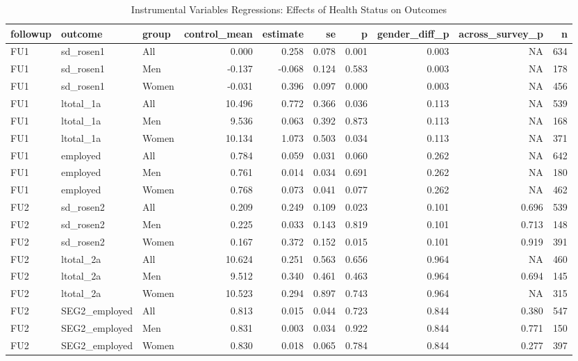 \begin{table}

\caption{Instrumental Variables Regressions: Effects of Health Status on Outcomes}
\centering
\begin{tabular}[t]{lllrrrrrrr}
\toprule
followup & outcome & group & control\_mean & estimate & se & p & gender\_diff\_p & across\_survey\_p & n\\
\midrule
FU1 & sd\_rosen1 & All & 0.000 & 0.258 & 0.078 & 0.001 & 0.003 & NA & 634\\
FU1 & sd\_rosen1 & Men & -0.137 & -0.068 & 0.124 & 0.583 & 0.003 & NA & 178\\
FU1 & sd\_rosen1 & Women & -0.031 & 0.396 & 0.097 & 0.000 & 0.003 & NA & 456\\
FU1 & ltotal\_1a & All & 10.496 & 0.772 & 0.366 & 0.036 & 0.113 & NA & 539\\
FU1 & ltotal\_1a & Men & 9.536 & 0.063 & 0.392 & 0.873 & 0.113 & NA & 168\\
\addlinespace
FU1 & ltotal\_1a & Women & 10.134 & 1.073 & 0.503 & 0.034 & 0.113 & NA & 371\\
FU1 & employed & All & 0.784 & 0.059 & 0.031 & 0.060 & 0.262 & NA & 642\\
FU1 & employed & Men & 0.761 & 0.014 & 0.034 & 0.691 & 0.262 & NA & 180\\
FU1 & employed & Women & 0.768 & 0.073 & 0.041 & 0.077 & 0.262 & NA & 462\\
FU2 & sd\_rosen2 & All & 0.209 & 0.249 & 0.109 & 0.023 & 0.101 & 0.696 & 539\\
\addlinespace
FU2 & sd\_rosen2 & Men & 0.225 & 0.033 & 0.143 & 0.819 & 0.101 & 0.713 & 148\\
FU2 & sd\_rosen2 & Women & 0.167 & 0.372 & 0.152 & 0.015 & 0.101 & 0.919 & 391\\
FU2 & ltotal\_2a & All & 10.624 & 0.251 & 0.563 & 0.656 & 0.964 & NA & 460\\
FU2 & ltotal\_2a & Men & 9.512 & 0.340 & 0.461 & 0.463 & 0.964 & 0.694 & 145\\
FU2 & ltotal\_2a & Women & 10.523 & 0.294 & 0.897 & 0.743 & 0.964 & NA & 315\\
\addlinespace
FU2 & SEG2\_employed & All & 0.813 & 0.015 & 0.044 & 0.723 & 0.844 & 0.380 & 547\\
FU2 & SEG2\_employed & Men & 0.831 & 0.003 & 0.034 & 0.922 & 0.844 & 0.771 & 150\\
FU2 & SEG2\_employed & Women & 0.830 & 0.018 & 0.065 & 0.784 & 0.844 & 0.277 & 397\\
\bottomrule
\end{tabular}
\end{table}
